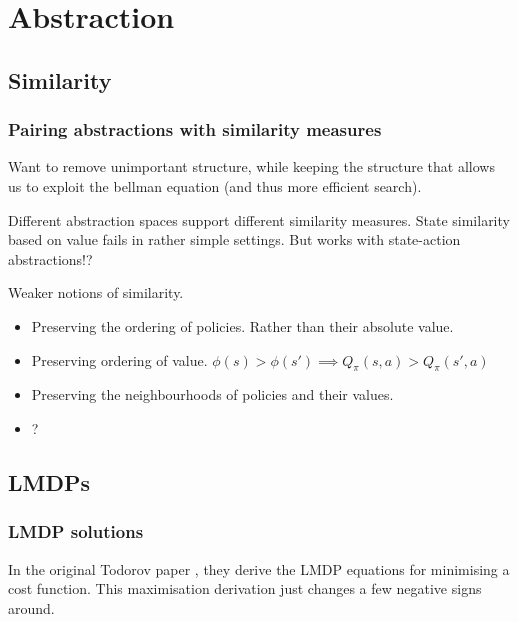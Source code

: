 \chapter{Abstraction}

\section{Similarity}

\subsection{Pairing abstractions with similarity measures}


Want to remove unimportant structure, while keeping the structure that allows us
to exploit the bellman equation (and thus more efficient search).

Different abstraction spaces support different similarity measures.
State similarity based on value fails in rather simple settings.
But works with state-action abstractions!?

Weaker notions of similarity.
\begin{itemize}
\tightlist
  \item Preserving the ordering of policies. Rather than their absolute value.
  \item Preserving ordering of value. $\phi(s) > \phi(s') \implies Q_{\pi}(s, a) > Q_{\pi}(s', a)$
  \item Preserving the neighbourhoods of policies and their values.
  \item ?
\end{itemize}


\section{LMDPs}

\subsection{LMDP solutions}\label{lmdp-derivation}


In the original Todorov paper \cite{Todorov2009}, they derive the LMDP equations for minimising a cost function. This maximisation derivation just changes a few negative signs around.

